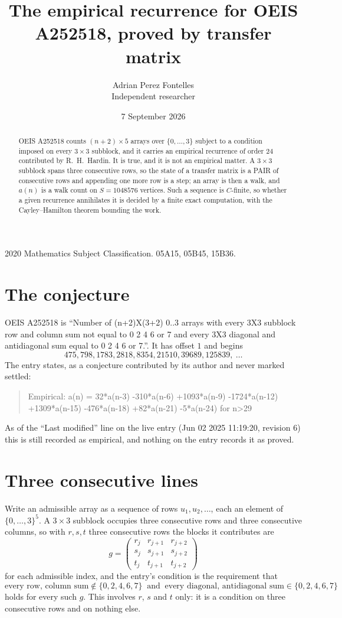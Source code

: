 \documentclass[11pt,a4paper]{article}
\title{The empirical recurrence for OEIS A252518, proved by transfer matrix}
\author{Adrian Perez Fontelles\\ \small Independent researcher}
\date{7 September 2026}
\theoremstyle{plain}
\theoremstyle{definition}
\begin{document}
\maketitle

\begin{abstract}
OEIS A252518 counts $(n+2)\times5$ arrays over $\{0,\dots,3\}$ subject to a condition imposed on
every $3\times3$ subblock, and it carries an empirical recurrence of order $24$
contributed by R.~H.~Hardin. It is true, and it is not an empirical matter. A $3\times3$
subblock spans three consecutive rows, so the state of a transfer matrix is a PAIR of
consecutive rows and appending one more row is a step; an array is then a walk, and
$a(n)$ is a walk count on $S=1048576$ vertices. Such a sequence is $C$-finite, so whether a given
recurrence annihilates it is decided by a finite exact computation, with the Cayley--Hamilton
theorem bounding the work.
\end{abstract}

\noindent\small 2020 Mathematics Subject Classification. 05A15, 05B45, 15B36.\normalsize

\section{The conjecture}

OEIS A252518 is ``Number of (n+2)X(3+2) 0..3 arrays with every 3X3 subblock row and column sum not equal to 0 2 4 6 or 7 and every 3X3 diagonal and antidiagonal sum equal to 0 2 4 6 or 7.''. It has offset $1$ and begins
\[
475, 798, 1783, 2818, 8354, 21510, 39689, 125839,\ \dots
\]
The entry states, as a conjecture contributed by its author and never marked settled:
\begin{quote}
Empirical: a(n) = 32*a(n-3) -310*a(n-6) +1093*a(n-9) -1724*a(n-12) +1309*a(n-15) -476*a(n-18) +82*a(n-21) -5*a(n-24) for n>29
\end{quote}
As of the ``Last modified'' line on the live entry (Jun 02 2025 11:19:20, revision 6) this is still
recorded as empirical, and nothing on the entry records it as proved.

\section{Three consecutive lines}

Write an admissible array as a sequence of rows $u_1,u_2,\dots$, each an element of
$\{0,\dots,3\}^{5}$. A $3\times3$ subblock occupies three consecutive rows and
three consecutive columns, so with $r,s,t$ three consecutive rows the blocks it
contributes are
\[
g=\begin{pmatrix}r_j&r_{j+1}&r_{j+2}\\ s_j&s_{j+1}&s_{j+2}\\ t_j&t_{j+1}&t_{j+2}\end{pmatrix}
\]
for each admissible index, and the entry's condition is the requirement that
\[
\text{every row, column sum} \notin \{0,2,4,6,7\}\ \text{ and }\ \text{every diagonal, antidiagonal sum} \in \{0,2,4,6,7\}
\]
holds for every such $g$. This involves $r$, $s$ and $t$ only: it is a condition on
three consecutive rows and on nothing else.
\end{document}
